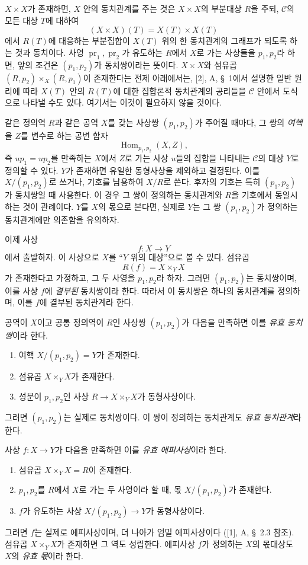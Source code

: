 $X\times X$가 존재하면, $X$ 안의 동치관계를 주는 것은 $X\times X$의
부분대상 $R$을 주되, $\mathcal C$의 모든 대상 $T$에 대하여
\[
  (X\times X)(T)=X(T)\times X(T)
\]
에서 $R(T)$에 대응하는 부분집합이 $X(T)$ 위의 한 동치관계의
그래프가 되도록 하는 것과 동치이다. 사영
$\operatorname{pr}_1,\operatorname{pr}_2$가 유도하는 $R$에서 $X$로
가는 사상들을 $p_1,p_2$라 하면, 앞의 조건은 $(p_1,p_2)$가
동치쌍이라는 뜻이다. $X\times X$와 섬유곱
$(R,p_2)\times_X(R,p_1)$이 존재한다는 전제 아래에서는, [2], A,
\S~1에서 설명한 일반 원리에 따라 $X(T)$ 안의 $R(T)$에 대한 집합론적
동치관계의 공리들을 $\mathcal C$ 안에서 도식으로 나타낼 수도 있다.
여기서는 이것이 필요하지 않을 것이다.

같은 정의역 $R$과 같은 공역 $X$를 갖는 사상쌍 $(p_1,p_2)$가 주어질
때마다, 그 쌍의 \emph{여핵}을 $Z$를 변수로 하는 공변 함자
\[
  \operatorname{Hom}_{p_1,p_2}(X,Z),
\]
즉 $up_1=up_2$를 만족하는 $X$에서 $Z$로 가는 사상 $u$들의 집합을
나타내는 $\mathcal C$의 대상 $Y$로 정의할 수 있다. $Y$가 존재하면
유일한 동형사상을 제외하고 결정된다. 이를 $X/(p_1,p_2)$로 쓰거나,
기호를 남용하여 $X/R$로 쓴다. 후자의 기호는 특히
$(p_1,p_2)$가 동치쌍일 때 사용한다. 이 경우 그 쌍이 정의하는
동치관계와 $R$을 기호에서 동일시하는 것이 관례이다. $Y$를 $X$의
몫으로 본다면, 실제로 $Y$는 그 쌍 $(p_1,p_2)$가 정의하는 동치관계에만
의존함을 유의하자.

이제 사상
\[
  f:X\longrightarrow Y
\]
에서 출발하자. 이 사상으로 $X$를 ``$Y$ 위의 대상''으로 볼 수 있다.
섬유곱
\[
  R(f)=X\times_Y X
\]
가 존재한다고 가정하고, 그 두 사영을 $p_1,p_2$라 하자. 그러면
$(p_1,p_2)$는 동치쌍이며, 이를 사상 $f$에 \emph{결부된} 동치쌍이라
한다. 따라서 이 동치쌍은 하나의 동치관계를 정의하며, 이를 $f$에
결부된 동치관계라 한다.

공역이 $X$이고 공통 정의역이 $R$인 사상쌍 $(p_1,p_2)$가 다음을
만족하면 이를 \emph{유효 동치쌍}이라 한다.
\begin{enumerate}
  \item[(i)] 여핵 $X/(p_1,p_2)=Y$가 존재한다.
  \item[(ii)] 섬유곱 $X\times_Y X$가 존재한다.
  \item[(iii)] 성분이 $p_1,p_2$인 사상
  $R\longrightarrow X\times_Y X$가 동형사상이다.
\end{enumerate}
그러면 $(p_1,p_2)$는 실제로 동치쌍이다. 이 쌍이 정의하는 동치관계도
\emph{유효 동치관계}라 한다.

사상 $f:X\longrightarrow Y$가 다음을 만족하면 이를 \emph{유효
에피사상}이라 한다.
\begin{enumerate}
  \item[(i)] 섬유곱 $X\times_Y X=R$이 존재한다.
  \item[(ii)] $p_1,p_2$를 $R$에서 $X$로 가는 두 사영이라 할 때,
  몫 $X/(p_1,p_2)$가 존재한다.
  \item[(iii)] $f$가 유도하는 사상
  $X/(p_1,p_2)\longrightarrow Y$가 동형사상이다.
\end{enumerate}
그러면 $f$는 실제로 에피사상이며, 더 나아가 엄밀 에피사상이다
([1], A, \S~2.3 참조). 섬유곱 $X\times_Y X$가 존재하면 그 역도
성립한다. 에피사상 $f$가 정의하는 $X$의 몫대상도 $X$의
\emph{유효 몫}이라 한다.

